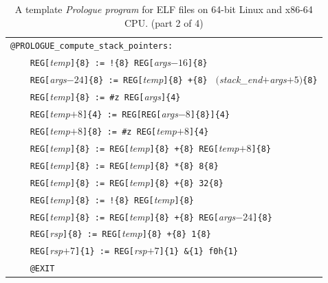 \documentclass[10pt,twocolumn]{article}
\begin{document}
\begin{table}[!h]
\begin{center}
\begin{tabular}{l}
\texttt{@PROLOGUE\_compute\_stack\_pointers:}\\ %
\texttt{~~~~REG[}\textit{temp}\texttt{]\{8\} := !\{8\} REG[}\textit{args}$ -16
$\texttt{]\{8\}}\\ %
\texttt{~~~~REG[}\textit{args}$ -24 $\texttt{]\{8\} :=
REG[}\textit{temp}\texttt{]\{8\} +\{8\} } $ ( $\textit{stack\_end}$ +
$\textit{args}$ + 5) $\texttt{\{8\}}\\ %
\texttt{~~~~REG[}\textit{temp}\texttt{]\{8\} := \#z
REG[}\textit{args}\texttt{]\{4\}}\\ %
\texttt{~~~~REG[}\textit{temp}$ +8 $\texttt{]\{4\} := REG[REG[}\textit{args}$ -8
$\texttt{]\{8\}]\{4\}}\\ %
\texttt{~~~~REG[}\textit{temp}$ +8 $\texttt{]\{8\} := \#z REG[}\textit{temp}$ +8
$\texttt{]\{4\}}\\ %
\texttt{~~~~REG[}\textit{temp}\texttt{]\{8\} := REG[}\textit{temp}\texttt{]\{8\}
+\{8\} REG[}\textit{temp}$ +8 $\texttt{]\{8\}}\\ %
\texttt{~~~~REG[}\textit{temp}\texttt{]\{8\} := REG[}\textit{temp}\texttt{]\{8\}
*\{8\} 8\{8\}}\\ %
\texttt{~~~~REG[}\textit{temp}\texttt{]\{8\} := REG[}\textit{temp}\texttt{]\{8\}
+\{8\} 32\{8\}}\\ %
\texttt{~~~~REG[}\textit{temp}\texttt{]\{8\} := !\{8\}
REG[}\textit{temp}\texttt{]\{8\}}\\ %
\texttt{~~~~REG[}\textit{temp}\texttt{]\{8\} := REG[}\textit{temp}\texttt{]\{8\}
+\{8\} REG[}\textit{args}$ -24 $\texttt{]\{8\}}\\ %
\texttt{~~~~REG[}\textit{rsp}\texttt{]\{8\} := REG[}\textit{temp}\texttt{]\{8\}
+\{8\} 1\{8\}}\\ %
\texttt{~~~~REG[}\textit{rsp}$ +7 $\texttt{]\{1\} := REG[}\textit{rsp}$ +7
$\texttt{]\{1\} \&\{1\} f0h\{1\}}\\ %
\texttt{~~~~@EXIT}\\ %

\end{tabular}
\end{center}
\caption{A template \emph{Prologue program} for ELF files on 64-bit Linux and
x86-64 CPU. (part 2 of 4)} %
\end{table}
\end{document}
